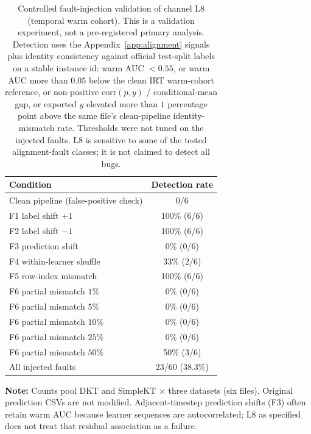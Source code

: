 \begin{table}[htbp]
\caption{Controlled fault-injection validation of channel L8 (temporal warm cohort). This is a validation experiment, not a pre-registered primary analysis. Detection uses the Appendix~\ref{app:alignment} signals plus identity consistency against official test-split labels on a stable instance id: warm AUC $< 0.55$, or warm AUC more than $0.05$ below the clean IRT warm-cohort reference, or non-positive $\mathrm{corr}(p,y)$ / conditional-mean gap, or exported $y$ elevated more than $1$ percentage point above the same file's clean-pipeline identity-mismatch rate. Thresholds were not tuned on the injected faults. L8 is sensitive to some of the tested alignment-fault classes; it is not claimed to detect all bugs.}\label{tab:l8_fault_injection}
\centering
\small
\begin{tabular}{lc}
\toprule
\textbf{Condition} & \textbf{Detection rate} \\
\midrule
Clean pipeline (false-positive check) & 0/6 \\
F1 label shift $+1$ & 100\% (6/6) \\
F2 label shift $-1$ & 100\% (6/6) \\
F3 prediction shift & 0\% (0/6) \\
F4 within-learner shuffle & 33\% (2/6) \\
F5 row-index mismatch & 100\% (6/6) \\
\midrule
F6 partial mismatch $1\%$ & 0\% (0/6) \\
F6 partial mismatch $5\%$ & 0\% (0/6) \\
F6 partial mismatch $10\%$ & 0\% (0/6) \\
F6 partial mismatch $25\%$ & 0\% (0/6) \\
F6 partial mismatch $50\%$ & 50\% (3/6) \\
\midrule
All injected faults & 23/60 (38.3\%) \\
\bottomrule
\end{tabular}

\vspace{1ex}
{\scriptsize \textbf{Note:} Counts pool DKT and SimpleKT $\times$ three datasets (six files). Original prediction CSVs are not modified. Adjacent-timestep prediction shifts (F3) often retain warm AUC because learner sequences are autocorrelated; L8 as specified does not treat that residual association as a failure.\par}
\end{table}
